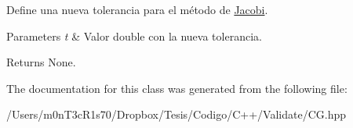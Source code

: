 Define una nueva tolerancia para el método de \hyperlink{class_jacobi}{Jacobi}. 


\begin{DoxyParams}{Parameters}
{\em t} & Valor double con la nueva tolerancia. \\
\hline
\end{DoxyParams}
\begin{DoxyReturn}{Returns}
None. 
\end{DoxyReturn}


The documentation for this class was generated from the following file\+:\begin{DoxyCompactItemize}
\item 
/\+Users/m0n\+T3c\+R1s70/\+Dropbox/\+Tesis/\+Codigo/\+C++/\+Validate/C\+G.\+hpp\end{DoxyCompactItemize}
